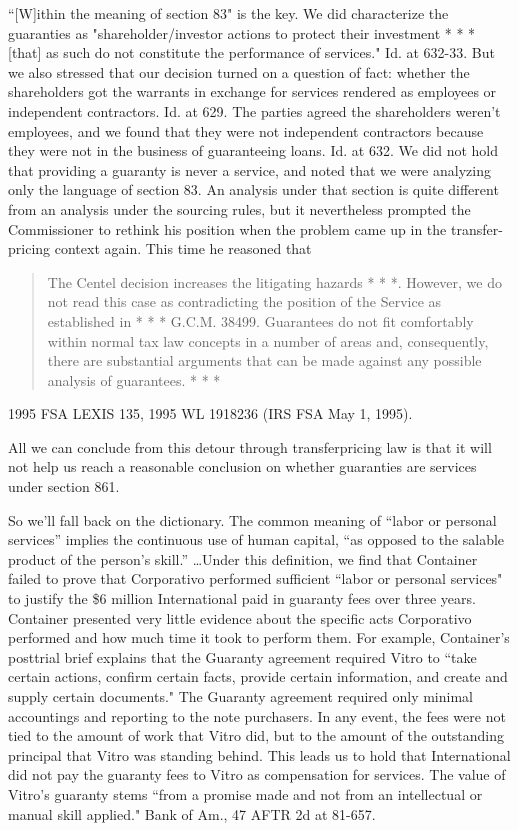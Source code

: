 \begin{select}
``[W]ithin the meaning of section 83" is the key. We did characterize the guaranties as "shareholder/investor actions to protect their investment * * * [that] as such do not constitute the performance of services." Id. at 632-33. But we  also stressed that our decision turned on a question of fact: whether the shareholders got the warrants in exchange for services rendered as employees or independent contractors. Id. at 629. The parties agreed the shareholders weren't employees, and we found that they were not independent contractors because they were not in the business of guaranteeing loans. Id. at 632. We did not hold that providing a guaranty is never a service, and noted that we were analyzing only the language of section 83. An analysis under that section is quite different from an analysis under the sourcing rules, but it nevertheless prompted the Commissioner to rethink his position when the problem came up in the transfer-pricing context again. This time he reasoned that

\begin{quote}
The Centel decision increases the litigating hazards * * *. However, we do not read this case as contradicting the position of the Service as established in * * * G.C.M. 38499. Guarantees do not fit comfortably within normal tax law concepts in a number of areas and, consequently, there are substantial arguments that can be made against any possible analysis of guarantees. * * *
\end{quote}
1995 FSA LEXIS 135, 1995 WL 1918236 (IRS FSA May 1, 1995).

All we can conclude from this detour through transferpricing law is that it will not help us reach a reasonable conclusion on whether guaranties are services under section 861.

So we'll fall back on the dictionary. The common meaning of ``labor or personal services'' implies the continuous use of human capital, ``as opposed to the salable product of the person's skill.'' \ldots Under this definition, we find that Container failed to prove that Corporativo performed sufficient ``labor or personal services" to justify the \$6 million International paid in guaranty fees over three years. Container presented very little evidence about the specific acts Corporativo performed and how much time it took to perform them. For example, Container's posttrial brief explains that the Guaranty agreement required Vitro to ``take certain actions, confirm certain facts, provide certain information, and create and supply certain documents." The Guaranty agreement required only minimal accountings and reporting to the note purchasers. In any event, the fees were not tied to the amount of work that Vitro did, but to the amount of the outstanding principal that Vitro was standing behind. This leads us to hold that International did not pay the guaranty fees to Vitro as compensation for services. The value of Vitro's guaranty stems ``from a promise made and not from an intellectual or manual skill applied." Bank of Am., 47 AFTR 2d at 81-657.



\end{select}
